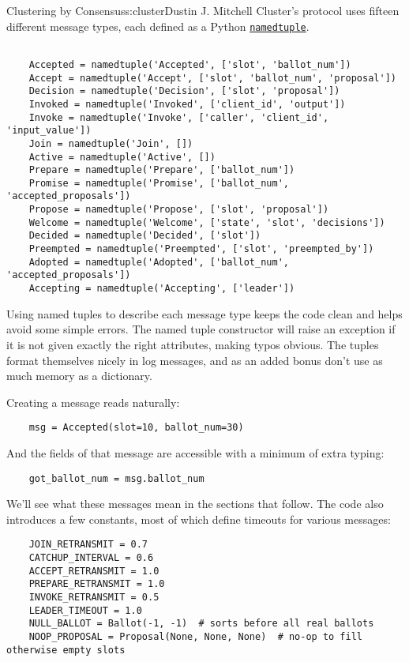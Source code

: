 \begin{aosachapter}{Clustering by Consensus}{s:cluster}{Dustin J. Mitchell}
Cluster's protocol uses fifteen different message types, each defined as
a Python
\href{https://docs.python.org/3/library/collections.html}{\texttt{namedtuple}}.

\begin{verbatim}

    Accepted = namedtuple('Accepted', ['slot', 'ballot_num'])
    Accept = namedtuple('Accept', ['slot', 'ballot_num', 'proposal'])
    Decision = namedtuple('Decision', ['slot', 'proposal'])
    Invoked = namedtuple('Invoked', ['client_id', 'output'])
    Invoke = namedtuple('Invoke', ['caller', 'client_id', 'input_value'])
    Join = namedtuple('Join', [])
    Active = namedtuple('Active', [])
    Prepare = namedtuple('Prepare', ['ballot_num'])
    Promise = namedtuple('Promise', ['ballot_num', 'accepted_proposals'])
    Propose = namedtuple('Propose', ['slot', 'proposal'])
    Welcome = namedtuple('Welcome', ['state', 'slot', 'decisions'])
    Decided = namedtuple('Decided', ['slot'])
    Preempted = namedtuple('Preempted', ['slot', 'preempted_by'])
    Adopted = namedtuple('Adopted', ['ballot_num', 'accepted_proposals'])
    Accepting = namedtuple('Accepting', ['leader'])
\end{verbatim}

Using named tuples to describe each message type keeps the code clean
and helps avoid some simple errors. The named tuple constructor will
raise an exception if it is not given exactly the right attributes,
making typos obvious. The tuples format themselves nicely in log
messages, and as an added bonus don't use as much memory as a
dictionary.

Creating a message reads naturally:

\begin{verbatim}
    msg = Accepted(slot=10, ballot_num=30)
\end{verbatim}

And the fields of that message are accessible with a minimum of extra
typing:

\begin{verbatim}
    got_ballot_num = msg.ballot_num
\end{verbatim}

We'll see what these messages mean in the sections that follow. The code
also introduces a few constants, most of which define timeouts for
various messages:

\begin{verbatim}
    JOIN_RETRANSMIT = 0.7
    CATCHUP_INTERVAL = 0.6
    ACCEPT_RETRANSMIT = 1.0
    PREPARE_RETRANSMIT = 1.0
    INVOKE_RETRANSMIT = 0.5
    LEADER_TIMEOUT = 1.0
    NULL_BALLOT = Ballot(-1, -1)  # sorts before all real ballots
    NOOP_PROPOSAL = Proposal(None, None, None)  # no-op to fill otherwise empty slots
    

\end{verbatim}
\end{aosachapter}
